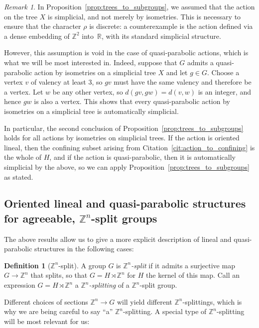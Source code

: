 \documentclass[10pt,a4paper]{article}
\theoremstyle{definition}
\newtheorem{defi}[cdrthm]{Definition}
\theoremstyle{remark}
\newtheorem{rema}[cdrthm]{Remark}
\newcommand{\Z}{\mathbb{Z}}
\newcommand{\R}{\mathbb{R}}
\theoremstyle{plain}
\begin{document}
\begin{rema}
\label{rem:simplicial}
    In Proposition~\ref{prop:trees_to_subgroups}, we assumed that the action on the tree $X$ is simplicial, and not merely by isometries. This is necessary to ensure that the character $\rho$ is discrete: a counterexample is the action defined via a dense embedding of $\Z^2$ into~$\R$, with its standard simplicial structure.

    However, this assumption is void in the case of quasi-parabolic actions, which is what we will be most interested in. Indeed, suppose that $G$ admits a quasi-parabolic action by isometries on a simplicial tree $X$ and let $g \in G$. Choose a vertex $v$ of valency at least $3$, so $gv$ must have the same valency and therefore be a vertex. Let $w$ be any other vertex, so $d(gv, gw) = d(v, w)$ is an integer, and hence $gw$ is also a vertex. This shows that every quasi-parabolic action by isometries on a simplicial tree is automatically simplicial.

    In particular, the second conclusion of Proposition~\ref{prop:trees_to_subgroups} holds for all actions by isometries on simplicial trees. If the action is oriented lineal, then the confining subset arising from Citation~\ref{cit:action_to_confining} is the whole of $H$, and if the action is quasi-parabolic, then it is automatically simplicial by the above, so we can apply Proposition~\ref{prop:trees_to_subgroups} as stated.
\end{rema}


\subsection{Oriented lineal and quasi-parabolic structures for agreeable, \texorpdfstring{$\Z^n$}{Zn}-split groups}\label{ssec:lin_qp}

The above results allow us to give a more explicit description of lineal and quasi-parabolic structures in the following cases:

\begin{defi}[$\Z^n$-split]
A group $G$ is \emph{$\Z^n$-split} if it admits a surjective map $G\to\Z^n$ that splits, so that $G=H\rtimes \Z^n$ for $H$ the kernel of this map. Call an expression $G=H\rtimes \Z^n$ a \emph{$\Z^n$-splitting} of a $\Z^n$-split group.
\end{defi}

Different choices of sections $\Z^n\to G$ will yield different $\Z^n$-splittings, which is why we are being careful to say ``a'' $\Z^n$-splitting. A special type of $\Z^n$-splitting will be most relevant for us:
\end{document}
